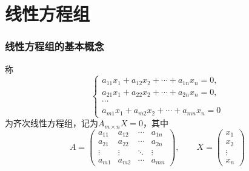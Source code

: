 \part{线性方程组}
\section{线性方程组的基本概念}
称
\[
    \begin{cases}
        a_{11}x_1 + a_{12}x_2 + \cdots + a_{1n}x_n = 0, \\
        a_{21}x_1 + a_{22}x_2 + \cdots + a_{2n}x_n = 0, \\
        \cdots                                          \\
        a_{m1}x_1 + a_{m2}x_2 + \cdots + a_{mn}x_n = 0
    \end{cases}
\]
为齐次线性方程组，记为$A_{m\times n}X=0$，其中
\[
    A =
    \begin{pmatrix}
        a_{11} & a_{12} & \cdots & a_{1n} \\
        a_{21} & a_{22} & \cdots & a_{2n} \\
        \vdots & \vdots & \ddots & \vdots \\
        a_{m1} & a_{m2} & \cdots & a_{mn}
    \end{pmatrix},
    \qquad
    X=
    \begin{pmatrix}
        x_1 \\x_2\\\vdots\\x_n
    \end{pmatrix}
\]

